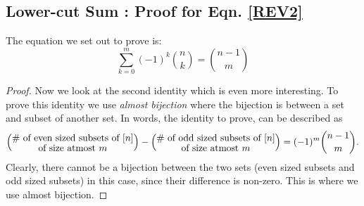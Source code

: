 \subsection{Lower-cut Sum : Proof for Eqn. \eqref{REV2}} \label{subsec:identity-even-odd-2}
The equation we set out to prove is:
$$\sum_{k=0}^m (-1)^k{n\choose k} = {n-1\choose m}$$
\begin{proof}
Now we look at the second identity which is even more interesting. To prove this identity we use \emph{almost bijection} where the bijection is between a set and subset of another set. In words, the identity to prove, can be described as
$$\Large\left(\substack{\# \textrm{ of even sized subsets of  $[n]$}\\  \textrm{of size atmost $m$}}\right) - \left(\substack{\# \textrm{ of odd sized subsets of $[n]$} \\ \textrm{of size atmost $m$}}\right) = (-1)^m{n-1\choose m}.$$ Clearly, there cannot be a bijection between the two sets (even sized subsets and odd sized subsets) in this case, since their difference is non-zero. This is where we use almost bijection.


\end{proof}
